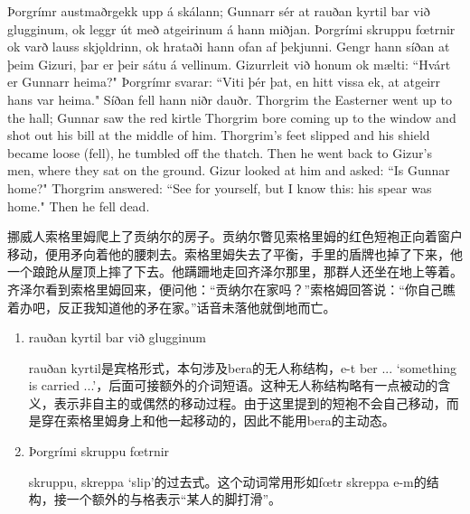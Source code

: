 \begin{paracol}{2}
    Þorgrímr austmaðr\footnotemark gekk upp á skálann; Gunnarr sér at rauðan kyrtil bar við glugginum, ok leggr út með atgeirinum á hann miðjan. 
    Þorgrími skruppu fœtrnir ok varð lauss skjǫldrinn, ok hrataði hann ofan af þekjunni. Gengr hann síðan at þeim Gizuri, þar er þeir sátu á vellinum. Gizurr\footnotemark leit við honum ok mælti: ``Hvárt er Gunnarr heima?" Þorgrímr svarar: ``Viti þér þat, en hitt vissa ek, at atgeirr hans var heima." Síðan fell hann niðr dauðr.
    \switchcolumn
    Thorgrim the Easterner went up to the hall; Gunnar saw the red kirtle Thorgrim bore coming up to the window and shot out his bill at the middle of him. Thorgrim's feet slipped and his shield became loose (fell), he tumbled off the thatch. Then he went back to Gizur's men, where they sat on the ground. Gizur looked at him and asked: ``Is Gunnar home?" Thorgrim answered: ``See for yourself, but I know this: his spear was home." Then he fell dead.
\end{paracol}
\begin{translation*}{}
    挪威人索格里姆爬上了贡纳尔的房子。贡纳尔瞥见索格里姆的红色短袍正向着窗户移动，便用矛向着他的腰刺去。索格里姆失去了平衡，手里的盾牌也掉了下来，他一个踉跄从屋顶上摔了下去。他蹒跚地走回齐泽尔那里，那群人还坐在地上等着。齐泽尔看到索格里姆回来，便问他：“贡纳尔在家吗？”索格姆回答说：“你自己瞧着办吧，反正我知道他的矛在家。”话音未落他就倒地而亡。
\end{translation*}
\begin{grammar*}{}
    \begin{enumerate}[leftmargin=*]
        \item rauðan kyrtil bar við glugginum

              rauðan kyrtil是宾格形式，本句涉及bera的无人称结构，e-t ber ... `something is carried ...'，后面可接额外的介词短语。这种无人称结构略有一点被动的含义，表示非自主的或偶然的移动过程。由于这里提到的短袍不会自己移动，而是穿在索格里姆身上和他一起移动的，因此不能用bera的主动态。

        \item Þorgrími skruppu fœtrnir

              skruppu, skreppa `slip'的过去式。这个动词常用形如fœtr skreppa e-m的结构，接一个额外的与格表示“某人的脚打滑”。
    \end{enumerate}
\end{grammar*}
